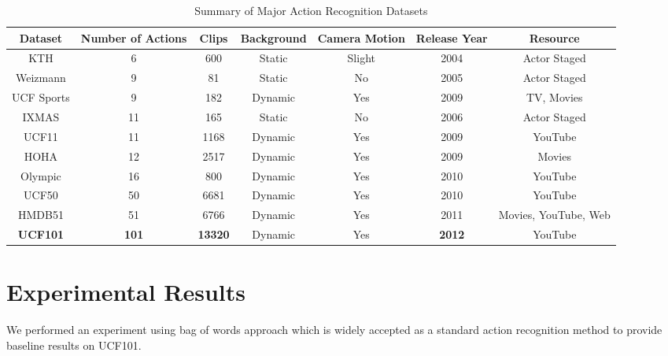 \documentclass[10pt,twocolumn,letterpaper]{article}
\begin{document}
\begin{table*}
\begin{center}
\begin{tabular}{ c|c c c c c c}
\hline
Dataset & Number of Actions & Clips & Background & Camera Motion & Release Year & Resource \\
\hline
\hline

KTH \cite{KTH}   & 6 & 600 & Static & Slight & 2004 & Actor Staged\\
Weizmann \cite{Weizmann}  & 9 &  81 & Static & No & 2005 & Actor Staged\\
UCF Sports \cite{UCFSports}  & 9 &  182 & Dynamic & Yes & 2009 & TV, Movies\\
IXMAS \cite{IXMAS} & 11 &  165 & Static & No & 2006 & Actor Staged\\
UCF11 \cite{UCF11}  & 11 & 1168 & Dynamic & Yes & 2009 & YouTube\\
HOHA \cite{HOHA}  & 12 &  2517 & Dynamic & Yes & 2009 & Movies\\
Olympic \cite{Olympic}  & 16 &  800 & Dynamic & Yes & 2010 & YouTube\\
UCF50 \cite{UCF50} & 50 &  6681 & Dynamic & Yes & 2010 & YouTube\\
HMDB51 \cite{HMDB51} & 51 & 6766 &Dynamic & Yes & 2011 & Movies, YouTube, Web\\
\hline


\textbf{UCF101}  & \textbf{101} & \textbf{13320} & Dynamic & Yes & \textbf{2012} &  YouTube  \\

\hline
\end{tabular}
\end{center}
\caption{Summary of Major Action Recognition Datasets}
\label{tab:datasets}
\end{table*}


\section{Experimental Results}

We performed an experiment using bag of words approach which is widely accepted as a standard action recognition method to provide baseline results on UCF101.
\end{document}
